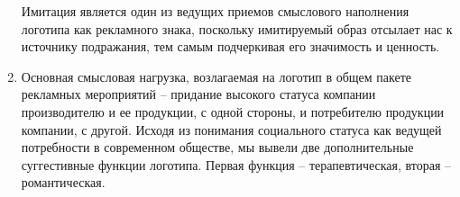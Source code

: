 \begin{enumerate}
Имитация является один из ведущих приемов смыслового наполнения логотипа как рекламного знака, поскольку имитируемый образ отсылает нас к источнику подражания, тем самым подчеркивая его значимость и ценность.
\item Основная смысловая нагрузка, возлагаемая на логотип в общем пакете рекламных мероприятий – придание высокого статуса компании производителю и ее продукции, с одной стороны, и потребителю продукции компании, с другой. Исходя из понимания социального статуса как ведущей потребности в современном обществе, мы вывели две дополнительные суггестивные функции логотипа. Первая функция – терапевтическая, вторая – романтическая.
\end{enumerate}
